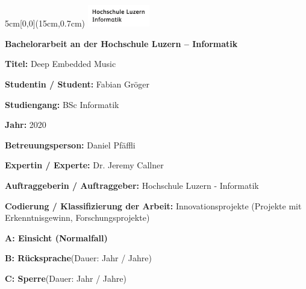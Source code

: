 
\begin{textblock*}{5cm}[0,0](15cm,0.7cm)
	\includegraphics[keepaspectratio,width=2.7cm]{img/HSLU_Logo_Header}
\end{textblock*}

\vspace{0.6cm}
\noindent
\textbf{\Large{Bachelorarbeit an der Hochschule Luzern – Informatik}}

\vspace{0.6cm}
\noindent
\textbf{Titel:} Deep Embedded Music

\vspace{0.6cm}
\noindent
\textbf{Studentin / Student:} Fabian Gröger

\vspace{0.6cm}
\noindent
\textbf{Studiengang:} BSc Informatik

\vspace{0.6cm}
\noindent
\textbf{Jahr:} 2020

\vspace{0.6cm}
\noindent
\textbf{Betreuungsperson:} Daniel Pfäffli

\vspace{0.6cm}
\noindent
\textbf{Expertin / Experte:} Dr. Jeremy Callner

\vspace{0.6cm}
\noindent
\textbf{Auftraggeberin / Auftraggeber:} Hochschule Luzern - Informatik

\vspace*{1.00cm}

\noindent
\textbf{Codierung / Klassifizierung der Arbeit:} Innovationsprojekte (Projekte mit
Erkenntnisgewinn, Forschungsprojekte)

\begin{todolist}
	\item \textbf{A: Einsicht (Normalfall)}
	\item \textbf{B: Rücksprache}\hspace*{0.7cm}(Dauer:\hspace*{1cm} Jahr / Jahre)
	\item \textbf{C: Sperre}\hspace*{1.865cm}(Dauer:\hspace*{1cm} Jahr / Jahre)
\end{todolist}

\vspace*{1.00cm}

